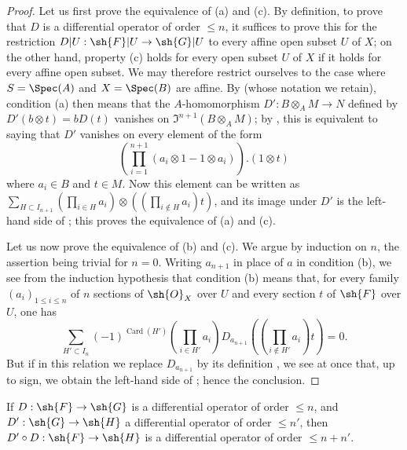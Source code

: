 \begin{proof}
Let us first prove the equivalence of (a) and (c).
By definition, to prove that $D$ is a differential operator of order $\leq n$, it suffices to prove this for the restriction $D|U: \sh{F}|U \to \sh{G}|U$ to every affine open subset $U$ of $X$; on the other hand, property (c) holds for every open subset $U$ of $X$ if it holds for every affine open subset.
We may therefore restrict ourselves to the case where $S = \Spec(A)$ and $X = \Spec(B)$ are affine.
By  (whose notation we retain), condition (a) then means that the $A$-homomorphism $D': B \otimes_A M \to N$ defined by $D'(b \otimes t) = b D(t)$ vanishes on $\mathfrak{I}^{n+1}(B \otimes_A M)$; by , this is equivalent to saying that $D'$ vanishes on every element of the form
\[
  (\prod_{i=1}^{n+1} (a_i \otimes 1 - 1 \otimes a_i) ) . (1 \otimes t)
\]
where $a_i \in B$ and $t \in M$.
Now this element can be written as $\sum_{H \subset I_{n+1}} (\prod_{i \in H} a_i) \otimes ((\prod_{i \notin H} a_i ) t )$, and its image under $D'$ is the left-hand side of ; this proves the equivalence of (a) and (c).

Let us now prove the equivalence of (b) and (c).
We argue by induction on $n$, the assertion being trivial for $n=0$.
Writing $a_{n+1}$ in place of $a$ in condition (b), we see from the induction hypothesis that condition (b) means that, for every family $(a_i)_{1 \leq i \leq n}$ of $n$ sections of $\sh{O}_X$ over $U$ and every section $t$ of $\sh{F}$ over $U$, one has
\[
  \sum_{H' \subset I_n} (-1)^{\operatorname{Card}(H')}  (\prod_{i \in H'} a_i) D_{a_{n+1}} ((\prod_{i \notin H'} a_i ) t ) = 0.
\]
But if in this relation we replace $D_{a_{n+1}}$ by its definition , we see at once that, up to sign, we obtain the left-hand side of ; hence the conclusion.
\end{proof}

\begin{proposition}[16.8.9]
\label{IV.16.8.9}
If $D: \sh{F} \to \sh{G}$ is a differential operator of order $\leq n$, and $D': \sh{G} \to \sh{H}$ a differential operator of order $\leq n'$, then $D' \circ D: \sh{F} \to \sh{H}$ is a differential operator of order $\leq n + n'$.
\end{proposition}

